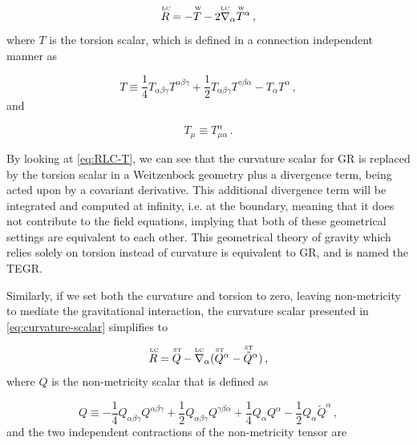 \begin{equation}
    \label{eq:RLC-T}
    \overtext{LC}{R} = -\overtext{W}{T} - 2\overtext{LC}{\nabla}_{\alpha} \overtext{W}{T}^{\alpha} \,,
\end{equation}
where $T$ is the torsion scalar, which is defined in a connection independent manner as

\begin{equation}
    T \equiv \frac{1}{4} T_{\alpha \beta \gamma} T^{\alpha \beta \gamma} +
    \frac{1}{2} T_{\alpha \beta \gamma} T^{\gamma \beta \alpha} -
    T_{\alpha}T^{\alpha} \,,
\end{equation}
and

\begin{equation}
    T_\mu \equiv T^\alpha_{\mu \alpha} \,.
\end{equation}

\noindent By looking at \cref{eq:RLC-T}, we can see that the curvature scalar for \gls{GR} is replaced by the torsion scalar in a Weitzenb$\ddot{\text{o}}$ck geometry plus a divergence term, being acted upon by a covariant derivative. This additional divergence term will be integrated and computed at infinity, i.e. at the boundary, meaning that it does not contribute to the field equations, implying that both of these geometrical settings are equivalent to each other. This geometrical theory of gravity which relies solely on torsion instead of curvature is equivalent to \gls{GR}, and is named the \gls{TEGR}.

Similarly, if we set both the curvature and torsion to zero, leaving non-metricity to mediate the gravitational interaction, the curvature scalar presented in \cref{eq:curvature-scalar} simplifies to

\begin{equation}
    \label{eq:RLC-Q}
    \overtext{LC}{R} = \overtext{ST}{Q} - \overtext{LC}{\nabla}_{\alpha}
    (\overtext{ST}{Q}^{\alpha} - \overtext{ST}{\tilde{Q}}^{\alpha}) \,,
\end{equation}
where $Q$ is the non-metricity scalar that is defined as

\begin{equation}
    \label{eq:Q}
    Q \equiv -\frac{1}{4} Q_{\alpha \beta \gamma} Q^{\alpha \beta \gamma} +
    \frac{1}{2} Q_{\alpha \beta \gamma} Q^{ \gamma \beta \alpha} +
    \frac{1}{4} Q_{\alpha}Q^{\alpha}
    - \frac{1}{2} Q_{\alpha} \tilde{Q}^{\alpha} \,,
\end{equation}
and the two independent contractions of the non-metricity tensor are

